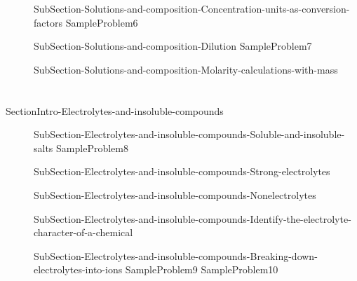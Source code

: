 \documentclass[main.tex]{subfiles} %
\newcommand\chapterlabel{Ch-electrolytes}\setcounter{figurenewcounter}{0}\setcounter{tablenewcounter}{0}\setcounter{formulanewcounter}{0}
\begin{document}
\begin{description}
\item[]{SubSection-Solutions-and-composition-Concentration-units-as-conversion-factors}
{SampleProblem6}
\item[]{SubSection-Solutions-and-composition-Dilution}
{SampleProblem7}
\item[]{SubSection-Solutions-and-composition-Molarity-calculations-with-mass}

\end{description}










\section{\color{blue!30!black}{Electrolytes and insoluble compounds}}
{SectionIntro-Electrolytes-and-insoluble-compounds}
\sloppy \begin{description}
\item[] {SubSection-Electrolytes-and-insoluble-compounds-Soluble-and-insoluble-salts}
{SampleProblem8}
\vspace{0cm}{Table-Solubility}
\item[]{SubSection-Electrolytes-and-insoluble-compounds-Strong-electrolytes}
\item[]{SubSection-Electrolytes-and-insoluble-compounds-Nonelectrolytes}

\item[]{SubSection-Electrolytes-and-insoluble-compounds-Identify-the-electrolyte-character-of-a-chemical}
 \vspace{1cm}{Table-Electrolytes	}	

\item[]{SubSection-Electrolytes-and-insoluble-compounds-Breaking-down-electrolytes-into-ions}%
{SampleProblem9}%
{SampleProblem10}%
\end{description}
\end{document}
